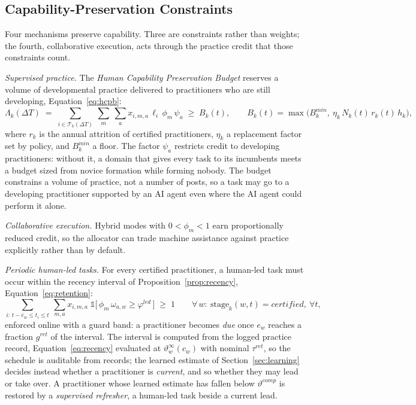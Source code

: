 \documentclass[utf8]{FrontiersinHarvard}
\begin{document}
	\subsection{Capability-Preservation Constraints}
	\label{sec:hcpb}

	Four mechanisms preserve capability. Three are constraints rather than weights; the fourth, collaborative execution, acts through the practice credit that those constraints count.

	\textit{Supervised practice.} The \textit{Human Capability Preservation Budget} reserves a volume of developmental practice delivered to practitioners who are still developing, Equation~\eqref{eq:hcpb}:
	\begin{equation}
		\Lambda_k(\Delta T)\;=\;\sum_{i \in \mathcal{T}_k(\Delta T)}\ \sum_{m}\ \sum_{a}
		x_{i,m,a}\,\ell_i\,\phi_m\,\psi_a \;\geq\; B_k(t),
		\qquad
		B_k(t) = \max\!\Big(B_k^{min},\ \eta_k \, N_k(t)\, r_k(t)\, h_k\Big),
		\label{eq:hcpb}
	\end{equation}
	where $r_k$ is the annual attrition of certified practitioners, $\eta_k$ a replacement factor set by policy, and $B_k^{min}$ a floor. The factor $\psi_a$ restricts credit to developing practitioners: without it, a domain that gives every task to its incumbents meets a budget sized from novice formation while forming nobody. The budget constrains a volume of practice, not a number of posts, so a task may go to a developing practitioner supported by an AI agent even where the AI agent could perform it alone.

	\textit{Collaborative execution.} Hybrid modes with $0<\phi_m<1$ earn proportionally reduced credit, so the allocator can trade machine assistance against practice explicitly rather than by default.

	\textit{Periodic human-led tasks.} For every certified practitioner, a human-led task must occur within the recency interval of Proposition~\ref{prop:recency}, Equation~\eqref{eq:retention}:
	\begin{equation}
		\sum_{i:\,t-\bar e_w\le t_i\le t}\ \sum_{m,a} x_{i,m,a}\;\mathbb{1}\bigl[\,\phi_m\,\omega_{a,w}\ge \varphi^{led}\,\bigr] \;\ge\; 1
		\qquad \forall\, w:\ \mathrm{stage}_k(w,t)=\textit{certified},\ \forall t,
		\label{eq:retention}
	\end{equation}
	enforced online with a guard band: a practitioner becomes \textit{due} once $e_w$ reaches a fraction $g^{ret}$ of the interval. The interval is computed from the logged practice record, Equation~\eqref{eq:recency} evaluated at $\vartheta^{\infty}_w(c_w)$ with nominal $\tau^{ret}$, so the schedule is auditable from records; the learned estimate of Section~\ref{sec:learning} decides instead whether a practitioner is \textit{current}, and so whether they may lead or take over. A practitioner whose learned estimate has fallen below $\vartheta^{comp}$ is restored by a \textit{supervised refresher}, a human-led task beside a current lead.
\end{document}
